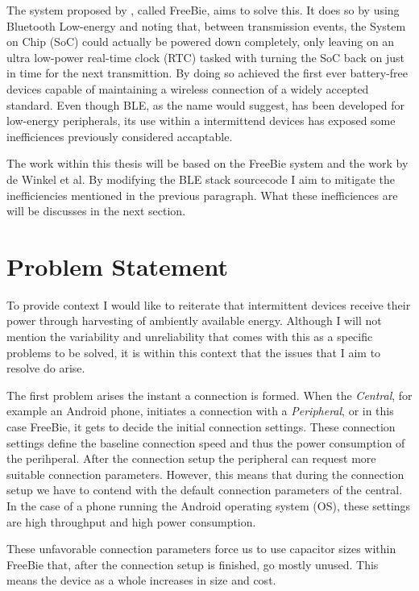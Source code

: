 The system proposed by \cite{freebie}, called FreeBie, aims to solve this. It does so by using Bluetooth Low-energy and noting that, between transmission events, the System on Chip (SoC) could actually be powered down completely, only leaving on an ultra low-power real-time clock (RTC) tasked with turning the SoC back on just in time for the next transmittion. By doing so \cite{freebie} achieved the first ever battery-free devices capable of maintaining a wireless connection of a widely accepted standard. Even though BLE, as the name would suggest, has been developed for low-energy peripherals, its use within a intermittend devices has exposed some inefficiences previously considered accaptable.

The work within this thesis will be based on the FreeBie system and the work by de Winkel et al. By modifying the BLE stack sourcecode I aim to mitigate the inefficiencies mentioned in the previous paragraph. What these inefficiences are will be discusses in the next section.

\section*{Problem Statement}

To provide context I would like to reiterate that intermittent devices receive their power through harvesting of ambiently available energy. Although I will not mention the variability and unreliability that comes with this as a specific problems to be solved, it is within this context that the issues that I aim to resolve do arise.

The first problem arises the instant a connection is formed. When the \textit{Central}, for example an Android phone, initiates a connection with a \textit{Peripheral}, or in this case FreeBie, it gets to decide the initial connection settings. These connection settings define the baseline connection speed and thus the power consumption of the perihperal. After the connection setup the peripheral can request more suitable connection parameters. However, this means that during the connection setup we have to contend with the default connection parameters of the central. In the case of a phone running the Android operating system (OS), these settings are high throughput and high power consumption. 

These unfavorable connection parameters force us to use capacitor sizes within FreeBie that, after the connection setup is finished, go mostly unused. This means the device as a whole increases in size and cost. 

